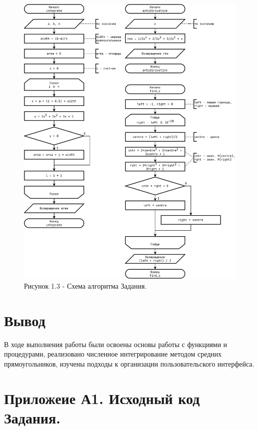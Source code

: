 \documentclass[oneside,a4paper,14pt]{extarticle}
\begin{document}
\begin{figure}[!ht]
	\centering
	\includegraphics[height=0.9\textheight]{pics/flowchart_p3.png}
	\caption*{Рисунок 1.3 - Схема алгоритма Задания.}
\end{figure}

\section*{Вывод}
В ходе выполнения работы были освоены основы работы с функциями и процедурами, реализовано численное интегрирование методом средних прямоугольников, изучены подходы к организации пользовательского интерфейса.\\

\section*{Приложеие А1. Исходный код Задания.}
\end{document}
